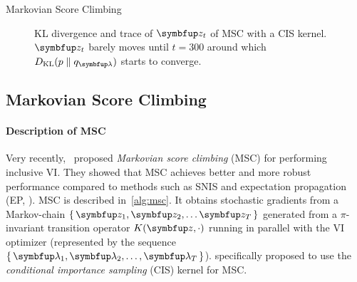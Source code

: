 \vspace{-0.1in}
%
  \begin{minipage}[l]{0.45\linewidth}
    \small
    \centering
    \begin{algorithm2e}[H]
      \DontPrintSemicolon
      \SetAlgoLined
      \caption{Markovian Score Climbing}\label{alg:msc}
    \end{algorithm2e}
    \vspace{-0.1in}
  \end{minipage}
  \qquad
  \begin{minipage}[r]{0.5\linewidth}
    \vspace{-0.1in}
    \begin{figure}[H]
      \centering
      
      \caption{KL divergence and trace of \(\vz_t\) of MSC with a CIS kernel.
        \(\vz_t\) barely moves until \(t=300\) around which \(\DKL{p}{q_{\vlambda}}\) starts to converge.}\label{fig:motivating}
    \end{figure}
    \vspace{-0.1in}
  \end{minipage}
%
\subsection{Markovian Score Climbing}\label{section:msc}
%
\paragraph{Description of MSC}
Very recently,~\citet{NEURIPS2020_b2070693} proposed \textit{Markovian score climbing} (MSC) for performing inclusive VI.
They showed that MSC achieves better and more robust performance compared to methods such as SNIS and expectation propagation (EP, \citealt{10.5555/2074022.2074067}).
MSC is described in~\cref{alg:msc}.
It obtains stochastic gradients from a Markov-chain \(\{\,\vz_1, \vz_2, \ldots \vz_T\,\}\) generated from a \(\pi\)-invariant transition operator \(K(\vz, \cdot)\) running in parallel with the VI optimizer (represented by the sequence \(\{\,\vlambda_1, \vlambda_2, \ldots, \vlambda_T\,\}\)).
\citeauthor{NEURIPS2020_b2070693} specifically proposed to use the \textit{conditional importance sampling} (CIS) kernel for MSC.

